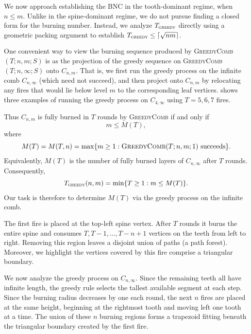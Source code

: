 \documentclass{article}
\newcommand{\gr}{\textsc{greedy}}
\begin{document}
We now approach establishing the BNC in the tooth-dominant regime, when $n \le m$. Unlike in the spine-dominant regime, we do not pursue finding a closed form for the burning number. Instead, we analyze $T_\gr$ directly using a geometric packing argument to establish $T_\gr \le \lceil \sqrt{nm}\rceil$.

One convenient way to view the burning sequence produced by 
\textsc{GreedyComb}$(T;n,m;S)$ is as the projection of the greedy sequence on 
\textsc{GreedyComb}$(T;n,\infty;S)$ onto $C_{n,m}$. 
That is, we first run the greedy process on the infinite comb $C_{n,\infty}$ (which need not succeed), and then project onto $C_{n,m}$ by relocating any fires that would lie below level $m$ to the corresponding leaf vertices.  shows three examples of running the greedy process on $C_{4,\infty}$ using $T = 5,6,7$ fires.

Thus $C_{n,m}$ is fully burned in $T$ rounds by \textsc{GreedyComb} if and only if 
\[
m \le M(T),
\]
where
\[
M(T)=M(T,n)=\max\{m \ge 1 : \textsc{GreedyComb}(T;n,m;1)\text{ succeeds}\}.
\]
Equivalently, $M(T)$ is the number of fully burned layers of $C_{n,\infty}$ after $T$ rounds. Consequently,
\[
T_{\gr}(n,m)=\min\{T\ge1 : m\le M(T)\}.
\]
Our task is therefore to determine $M(T)$ via the greedy process on the infinite comb.


The first fire is placed at the top-left spine vertex. After $T$ rounds it burns the entire spine and consumes $T,T-1,\dots,T-n+1$ vertices on the teeth from left to right. Removing this region leaves a disjoint union of paths (a path forest). Moreover, we highlight the vertices covered by this fire comprise a triangular boundary.

We now analyze the greedy process on $C_{n,\infty}$. Since the remaining teeth all have infinite length, the greedy rule selects the tallest available segment at each step. Since the burning radius decreases by one each round, the next $n$ fires are placed at the same height, beginning at the rightmost tooth and moving left one tooth at a time. The union of these $n$ burning regions forms a trapezoid fitting beneath the triangular boundary created by the first fire.
\end{document}

